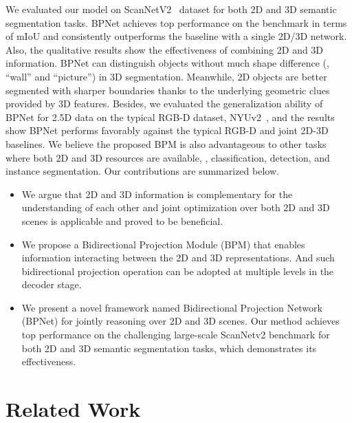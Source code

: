 \documentclass[final]{cvpr}
\begin{document}
We evaluated our model on ScanNetV2~\cite{dai2017scannet} dataset for both 2D and 3D semantic segmentation tasks. BPNet achieves top performance on the benchmark in terms of mIoU and consistently outperforms the baseline with a single 2D/3D network. 
Also, the qualitative results show the effectiveness of combining 2D and 3D information. BPNet can distinguish objects without much shape difference (\eg, ``wall'' and ``picture'') in 3D segmentation. 
Meanwhile, 2D objects are better segmented with sharper boundaries thanks to the underlying geometric clues provided by 3D features.
Besides, we evaluated the generalization ability of BPNet for 2.5D data on the typical RGB-D dataset, NYUv2~\cite{Silberman:ECCV12}, and the results show BPNet performs favorably against the typical RGB-D and joint 2D-3D baselines.
We believe the proposed BPM is also advantageous to other tasks where both 2D and 3D resources are available, \eg, classification, detection, and instance segmentation.
Our contributions are summarized below.
	\vspace{-2mm}
\begin{itemize}
	\item We argue that 2D and 3D information is complementary for the understanding of each other and joint optimization over both 2D and 3D scenes is applicable and proved to be beneficial.
	\vspace{-2mm}
	\item We propose a Bidirectional Projection Module (BPM) that enables information interacting between the 2D and 3D representations. And such bidirectional projection operation can be adopted at multiple levels in the decoder stage.
	\vspace{-2mm}
	\item We present a novel framework named Bidirectional Projection Network (BPNet) for jointly reasoning over 2D and 3D scenes. Our method achieves top performance on the challenging large-scale ScanNetv2 benchmark for both 2D and 3D semantic segmentation tasks, which demonstrates its effectiveness.
\end{itemize}












 \section{Related Work}
\label{sec:relatedWork}
\end{document}
